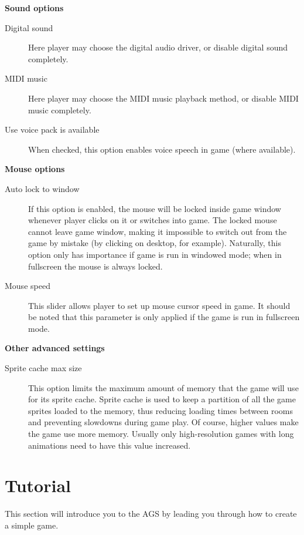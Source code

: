\bf{Sound options}

\begin{description}
\item [Digital sound]
  Here player may choose the digital audio driver, or disable digital sound completely.
\item [MIDI music]
  Here player may choose the MIDI music playback method, or disable MIDI music completely.
\item [Use voice pack is available]
  When checked, this option enables voice speech in game (where available).
\end{description}

\bf{Mouse options}

\begin{description}
\item [Auto lock to window]
  If this option is enabled, the mouse will be locked inside game window whenever player clicks on it or switches into game.
The locked mouse cannot leave game window, making it impossible to switch out from the game by mistake (by clicking on desktop,
for example). Naturally, this option only has importance if game is run in windowed mode; when in fullscreen the mouse is always
locked.
\item [Mouse speed]
  This slider allows player to set up mouse cursor speed in game. It should be noted that this parameter is only applied if the
game is run in fullscreen mode.
\end{description}

\bf{Other advanced settings}

\begin{description}
\item [Sprite cache max size]
  This option limits the maximum amount of memory that the game will use for its sprite cache. Sprite cache is used to
  keep a partition of all the game sprites loaded to the memory, thus reducing loading times between rooms and preventing
  slowdowns during game play.
  Of course, higher values make the game use more memory. Usually only high-resolution games with long animations need
  to have this value increased.
\end{description}


\chapter{Tutorial}%

This section will introduce you to the AGS by leading you through how to
create a simple game.

